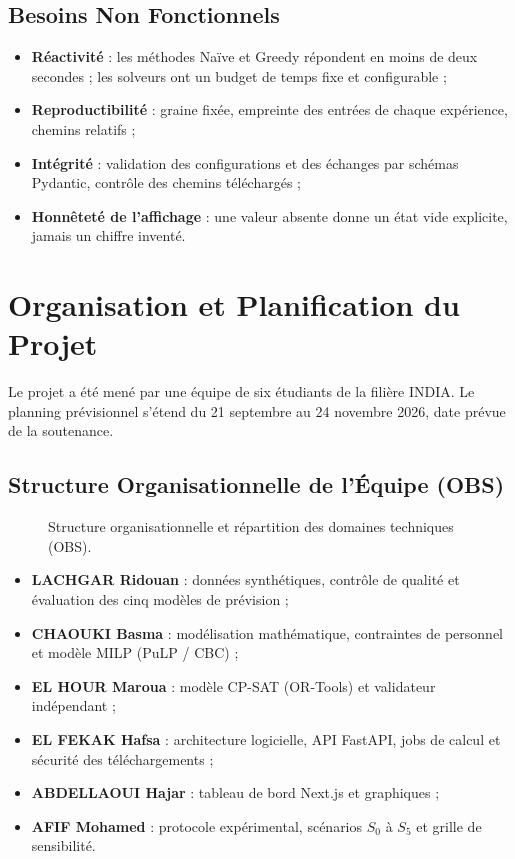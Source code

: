 \subsection{Besoins Non Fonctionnels}
\begin{itemize}
    \item \textbf{Réactivité} : les méthodes Naïve et Greedy répondent en moins de deux secondes ; les solveurs ont un budget de temps fixe et configurable ;
    \item \textbf{Reproductibilité} : graine fixée, empreinte des entrées de chaque expérience, chemins relatifs ;
    \item \textbf{Intégrité} : validation des configurations et des échanges par schémas Pydantic, contrôle des chemins téléchargés ;
    \item \textbf{Honnêteté de l'affichage} : une valeur absente donne un état vide explicite, jamais un chiffre inventé.
\end{itemize}

\section{Organisation et Planification du Projet}

Le projet a été mené par une équipe de six étudiants de la filière INDIA. Le planning prévisionnel s'étend du 21 septembre au 24 novembre 2026, date prévue de la soutenance.

\subsection{Structure Organisationnelle de l'Équipe (OBS)}
\begin{figure}[H]
    \centering
    \caption{Structure organisationnelle et répartition des domaines techniques (OBS).}
    \label{fig:obs_team}
\end{figure}

\begin{itemize}
    \item \textbf{LACHGAR Ridouan} : données synthétiques, contrôle de qualité et évaluation des cinq modèles de prévision ;
    \item \textbf{CHAOUKI Basma} : modélisation mathématique, contraintes de personnel et modèle MILP (PuLP / CBC) ;
    \item \textbf{EL HOUR Maroua} : modèle CP-SAT (OR-Tools) et validateur indépendant ;
    \item \textbf{EL FEKAK Hafsa} : architecture logicielle, API FastAPI, jobs de calcul et sécurité des téléchargements ;
    \item \textbf{ABDELLAOUI Hajar} : tableau de bord Next.js et graphiques ;
    \item \textbf{AFIF Mohamed} : protocole expérimental, scénarios $S_0$ à $S_5$ et grille de sensibilité.
\end{itemize}

